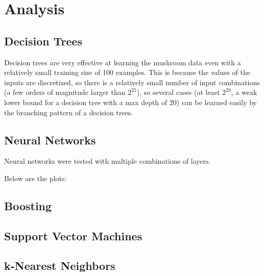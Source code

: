 \documentclass[11pt]{article}
\begin{document}
        \section{Analysis}

        \subsection{Decision Trees}


        Decision trees are very effective at learning the mushroom data even with a relatively
        small training size of 100 examples. This is because the values of the inputs
        are discretized, so there is a relatively small number of input combinations (a few orders
        of magnitude larger than $2^{25}$), so several cases (at least $2^{20}$, a weak lower bound for a decision tree with a max depth of 20) can be learned easily by the branching
        pattern of a decision trees.

        \subsection{Neural Networks}
        Neural networks were tested with multiple combinations of layers.

        Below are the plots:

        \subsection{Boosting}

        
        \subsection{Support Vector Machines}


        \subsection{k-Nearest Neighbors}

        

    
\end{document}
